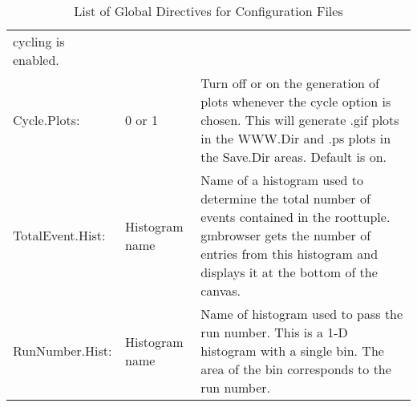 \documentclass[12pt]{article}
\begin{document}
\begin{table}
\begin{tabular}{llp{3.5in}}
                               cycling is enabled.\\
  Cycle.Plots:   & 0 or 1    & Turn off or on the generation of plots whenever
                               the cycle option is chosen. This will generate
                               .gif plots in the WWW.Dir and .ps plots in the 
                               Save.Dir areas. Default is on.\\
  TotalEvent.Hist: & Histogram name & Name of a histogram used to determine the
                                      total number of events contained in the
                                      roottuple. gmbrowser gets the number of 
                                      entries from this histogram and displays
                                      it at the bottom of the canvas.\\
  RunNumber.Hist: & Histogram name & Name of histogram used to pass the
                                     run number. This is a 1-D histogram with
                                     a single bin. The area of the bin 
                                     corresponds to the run number. \\
\hline
\end{tabular}
\caption{List of Global Directives for Configuration Files}
\label{tab:global}
\end{table}
\end{document}
